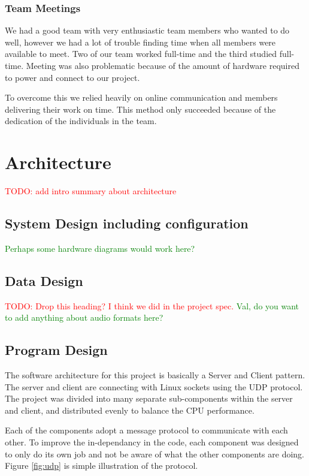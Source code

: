 \documentclass[11pt,a4paper,titlepage]{report}
\begin{document}
\subsubsection{Team Meetings}

We had a good team with very enthusiastic team members who wanted to do well, however we had a lot of trouble finding time when all members were available to meet. Two of our team worked full-time and the third studied full-time. Meeting was also problematic because of the amount of hardware required to power and connect to our project.

To overcome this we relied heavily on online communication and members delivering their work on time. This method only succeeded because of the dedication of the individuals in the team.


\section{Architecture}

\textcolor{red}{TODO: add intro summary about architecture}

\subsection{System Design including configuration}

\textcolor{green}{Perhaps some hardware diagrams would work here?}

\subsection{Data Design}

\textcolor{red}{TODO: Drop this heading? I think we did in the project spec.} \textcolor{green}{Val, do you want to add anything about audio formats here?}

\subsection{Program Design}


The software architecture for this project is basically a Server and Client pattern. The server and client are connecting with Linux sockets using the UDP protocol. The project was divided into many separate sub-components within the server and client, and distributed evenly to balance the CPU performance. 

Each of the components adopt a message protocol to communicate with each other. To improve the in-dependancy in the code, each component was designed to only do its own job and not be aware of what the other components are doing. Figure \ref{fig:udp} is simple illustration of the protocol.
\end{document}
